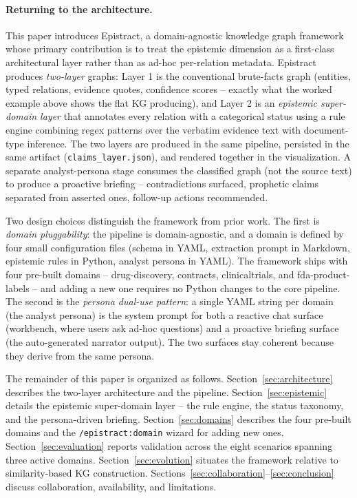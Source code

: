 \paragraph{Returning to the architecture.} This paper introduces Epistract, a domain-agnostic knowledge graph framework whose primary contribution is to treat the epistemic dimension as a first-class architectural layer rather than as ad-hoc per-relation metadata. Epistract produces \emph{two-layer} graphs: Layer 1 is the conventional brute-facts graph (entities, typed relations, evidence quotes, confidence scores -- exactly what the worked example above shows the flat KG producing), and Layer 2 is an \emph{epistemic super-domain layer} that annotates every relation with a categorical status using a rule engine combining regex patterns over the verbatim evidence text with document-type inference. The two layers are produced in the same pipeline, persisted in the same artifact (\texttt{claims\_layer.json}), and rendered together in the visualization. A separate analyst-persona stage consumes the classified graph (not the source text) to produce a proactive briefing -- contradictions surfaced, prophetic claims separated from asserted ones, follow-up actions recommended.

Two design choices distinguish the framework from prior work. The first is \emph{domain pluggability}: the pipeline is domain-agnostic, and a domain is defined by four small configuration files (schema in YAML, extraction prompt in Markdown, epistemic rules in Python, analyst persona in YAML). The framework ships with four pre-built domains -- drug-discovery, contracts, clinicaltrials, and fda-product-labels -- and adding a new one requires no Python changes to the core pipeline. The second is the \emph{persona dual-use pattern}: a single YAML string per domain (the analyst persona) is the system prompt for both a reactive chat surface (workbench, where users ask ad-hoc questions) and a proactive briefing surface (the auto-generated narrator output). The two surfaces stay coherent because they derive from the same persona.

The remainder of this paper is organized as follows. Section~\ref{sec:architecture} describes the two-layer architecture and the pipeline. Section~\ref{sec:epistemic} details the epistemic super-domain layer -- the rule engine, the status taxonomy, and the persona-driven briefing. Section~\ref{sec:domains} describes the four pre-built domains and the \texttt{/epistract:domain} wizard for adding new ones. Section~\ref{sec:evaluation} reports validation across the eight scenarios spanning three active domains. Section~\ref{sec:evolution} situates the framework relative to similarity-based KG construction. Sections~\ref{sec:collaboration}--\ref{sec:conclusion} discuss collaboration, availability, and limitations.

